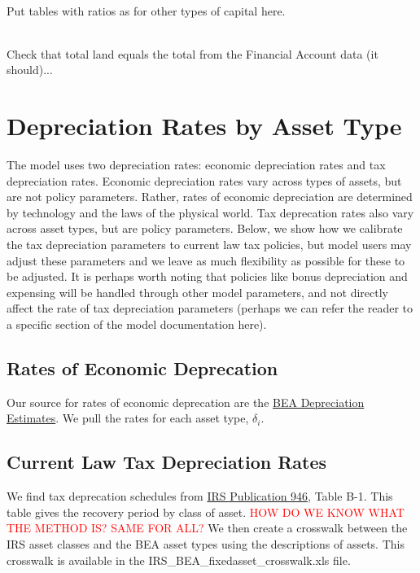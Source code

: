 \documentclass[article,11pt,letterpaper,fleqn]{article}
\theoremstyle{definition}
\numberwithin{equation}{section}
\begin{document}
\ \\
\begin{center}
Put tables with ratios as for other types of capital here.
\end{center}
\ \\

Check that total land equals the total from the Financial Account data (it should)...

\section{Depreciation Rates by Asset Type}
\label{sec:depr_rates}

The model uses two depreciation rates: economic depreciation rates and tax depreciation rates.  Economic depreciation rates vary across types of assets, but are not policy parameters.  Rather, rates of economic depreciation are determined by technology and the laws of the physical world.  Tax deprecation rates also vary across asset types, but are policy parameters.  Below, we show how we calibrate the tax depreciation parameters to current law tax policies, but model users may adjust these parameters and we leave as much flexibility as possible for these to be adjusted.  It is perhaps worth noting that policies like bonus depreciation and expensing will be handled through other model parameters, and not directly affect the rate of tax depreciation parameters (perhaps we can refer the reader to a specific section of the model documentation here). 

\subsection{Rates of Economic Deprecation}
Our source for rates of economic deprecation are the \href{http://bea.gov/national/FA2004/Tablecandtext.pdf}{BEA Depreciation Estimates}.  We pull the rates for each asset type, $\delta_{i}$.


\subsection{Current Law Tax Depreciation Rates}
\label{sec:tax_depr_rates}

We find tax deprecation schedules from \href{http://www.irs.gov/pub/irs-pdf/p946.pdf}{IRS Publication 946}, Table B-1.   This table gives the recovery period by class of asset.   \textcolor{red}{HOW DO WE KNOW WHAT THE METHOD IS?  SAME FOR ALL?}  We then create a crosswalk between the IRS asset classes and the BEA asset types using the descriptions of assets.  This crosswalk is available in the IRS\_BEA\_fixedasset\_crosswalk.xls file.  
\end{document}
